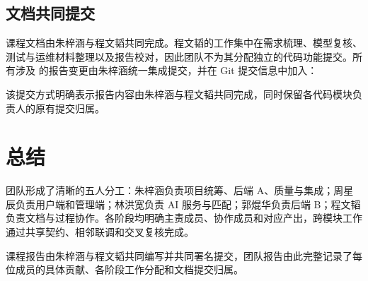 \subsection{文档共同提交}

课程文档由朱梓涵与程文韬共同完成。程文韬的工作集中在需求梳理、模型复核、测试与运维材料整理以及报告校对，因此团队不为其分配独立的代码功能提交。所有涉及  的报告变更由朱梓涵统一集成提交，并在 Git 提交信息中加入：

\begin{center}
\end{center}

该提交方式明确表示报告内容由朱梓涵与程文韬共同完成，同时保留各代码模块负责人的原有提交归属。

\section{总结}

团队形成了清晰的五人分工：朱梓涵负责项目统筹、后端 A、质量与集成；周星辰负责用户端和管理端；林洪宽负责 AI 服务与匹配；郭焜华负责后端 B；程文韬负责文档与过程协作。各阶段均明确主责成员、协作成员和对应产出，跨模块工作通过共享契约、相邻联调和交叉复核完成。

课程报告由朱梓涵与程文韬共同编写并共同署名提交，团队报告由此完整记录了每位成员的具体贡献、各阶段工作分配和文档提交归属。
